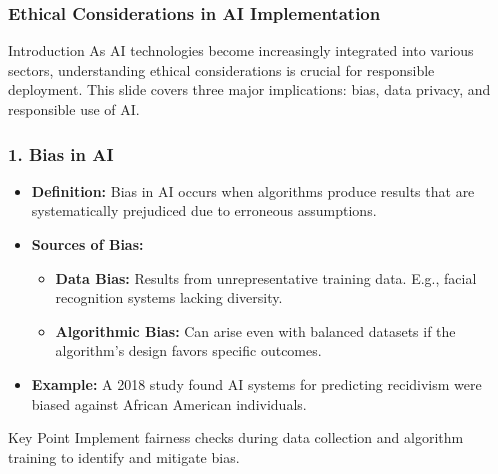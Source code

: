 \documentclass[aspectratio=169]{beamer}
\begin{document}
\begin{frame}[fragile]
    \frametitle{Ethical Considerations in AI Implementation}
    \begin{block}{Introduction}
        As AI technologies become increasingly integrated into various sectors, understanding ethical considerations is crucial for responsible deployment. This slide covers three major implications: bias, data privacy, and responsible use of AI.
    \end{block}
\end{frame}

\begin{frame}[fragile]
    \frametitle{1. Bias in AI}
    \begin{itemize}
        \item \textbf{Definition:} Bias in AI occurs when algorithms produce results that are systematically prejudiced due to erroneous assumptions.
        \item \textbf{Sources of Bias:}
        \begin{itemize}
            \item \textbf{Data Bias:} Results from unrepresentative training data. E.g., facial recognition systems lacking diversity.
            \item \textbf{Algorithmic Bias:} Can arise even with balanced datasets if the algorithm's design favors specific outcomes.
        \end{itemize}
        \item \textbf{Example:} A 2018 study found AI systems for predicting recidivism were biased against African American individuals.
    \end{itemize}
    \begin{block}{Key Point}
        Implement fairness checks during data collection and algorithm training to identify and mitigate bias.
    \end{block}
\end{frame}
\end{document}
